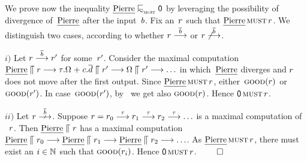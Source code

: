 \begin{example}
  \label{ex:p-testleqS-Nil}
  We prove now the inequality $\pierre \testleqS \Nil$ by leveraging %
    the possibility of divergence of~$\text{{\em Pierre}}$
after the input~$b$.
Fix an~$r$ such that $ \text{{\em Pierre}} \operatorname{\textsc{must}} r $. We
distinguish two cases, according to whether $r \mathrel{\overset{ \overline{b}}\longrightarrow}$
or $r \not \mathrel{\overset{ \overline{b}}\longrightarrow}$.


$i)$ %
Let $r \mathrel{\overset{ \overline{b}}\longrightarrow} r'$ for some~$r'$.
Consider the maximal computation
$ \text{{\em Pierre}}  \mathrel{\llceil} r \mathrel{\overset{}\longrightarrow} \tau.\Omega \mathrel{+}
  c.\overline{d} \mathrel{\llceil} r' \mathrel{\overset{}\longrightarrow} \Omega \mathrel{\llceil} r' \mathrel{\overset{}\longrightarrow}
\ldots $ in which~$\text{{\em Pierre}}$ diverges and $r$ does not move after
the first output.  Since $\text{{\em Pierre}} \operatorname{\textsc{must}} r$,
either~$\textsc{good}(r)$ or $\textsc{good}(r')$. In
case~$\textsc{good}(r')$, by~ we get also
$\textsc{good}(r)$.
Hence $ \Must{\Nil}{\client}$.

$ ii)$ Let $\client \Nst{\co{b}}$.
Suppose $r = r_0 \mathrel{\overset{\tau}\longrightarrow} r_1
  \mathrel{\overset{\tau}\longrightarrow} r_2 \mathrel{\overset{\tau}\longrightarrow} \ldots$ is a maximal computation of
  ~$r$.
  Then %
  $\text{{\em Pierre}}  \mathrel{\llceil} r$ has a maximal computation $
\text{{\em Pierre}} \mathrel{\llceil} r_0 \mathrel{\overset{}\longrightarrow}
\text{{\em Pierre}} \mathrel{\llceil} r_1 \mathrel{\overset{}\longrightarrow}
\text{{\em Pierre}} \mathrel{\llceil} r_2 \mathrel{\overset{}\longrightarrow}\ldots$.
As $\text{{\em Pierre}} \operatorname{\textsc{must}} r$,
there must exist an $i \in \mathbb{N}_{}$ such that $\good{\client_i}$. Hence
$ \Must{\Nil}{\client}$.
\hfill$\qed$
%
%


\end{example}
